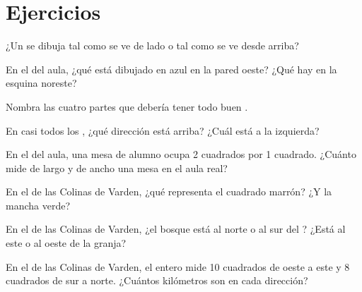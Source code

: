 \section{Ejercicios}

\begin{exercise}[$\star$]\label{exo:g2:drawing-to-map:1}
¿Un  se dibuja tal como se ve de lado o tal como se ve desde arriba?
\end{exercise}

\begin{exercise}[$\star$]\label{exo:g2:drawing-to-map:2}
En el  del aula, ¿qué está dibujado en azul en la pared oeste? ¿Qué hay
en la esquina noreste?
\end{exercise}

\begin{exercise}[$\star$]\label{exo:g2:drawing-to-map:3}
Nombra las cuatro partes que debería tener todo buen .
\end{exercise}

\begin{exercise}[$\star$]\label{exo:g2:drawing-to-map:4}
En casi todos los , ¿qué dirección está arriba? ¿Cuál está a la
izquierda?
\end{exercise}

\begin{exercise}[$\star$]\label{exo:g2:drawing-to-map:5}
En el  del aula, una mesa de alumno ocupa 2 cuadrados por 1 cuadrado.
¿Cuánto mide de largo y de ancho una mesa en el aula real?
\end{exercise}

\begin{exercise}[$\star$]\label{exo:g2:drawing-to-map:6}
En el  de las Colinas de Varden, ¿qué representa el cuadrado marrón? ¿Y
la mancha verde?
\end{exercise}

\begin{exercise}[$\star\star$]\label{exo:g2:drawing-to-map:7}
En el  de las Colinas de Varden, ¿el bosque está al norte o al sur del
? ¿Está al este o al oeste de la granja?
\end{exercise}

\begin{exercise}[$\star\star$]\label{exo:g2:drawing-to-map:8}
En el  de las Colinas de Varden, el  entero mide 10 cuadrados de
oeste a este y 8 cuadrados de sur a norte. ¿Cuántos kilómetros son en cada
dirección?
\end{exercise}


